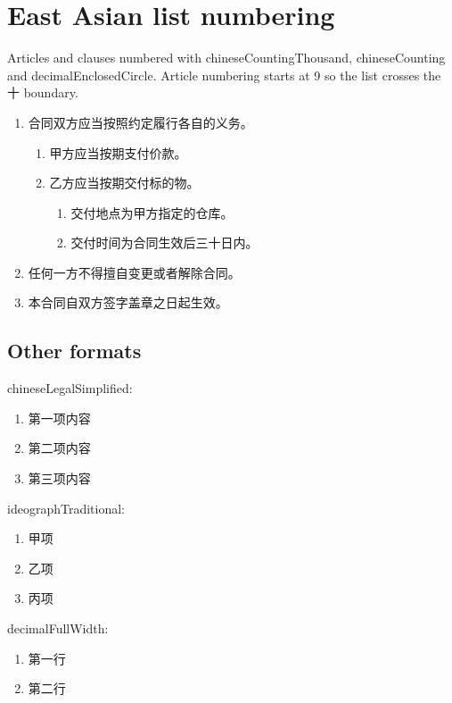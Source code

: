 \documentclass[11pt,a4paper]{article}
\begin{document}
\section{East Asian list numbering}

Articles and clauses numbered with chineseCountingThousand, chineseCounting and decimalEnclosedCircle. Article numbering starts at 9 so the list crosses the 十 boundary.

\begin{enumerate}
\item 合同双方应当按照约定履行各自的义务。
  \begin{enumerate}
\item 甲方应当按期支付价款。
\item 乙方应当按期交付标的物。
    \begin{enumerate}
\item 交付地点为甲方指定的仓库。
\item 交付时间为合同生效后三十日内。
    \end{enumerate}
  \end{enumerate}
\item 任何一方不得擅自变更或者解除合同。
\item 本合同自双方签字盖章之日起生效。
\end{enumerate}

\subsection{Other formats}

chineseLegalSimplified:

\begin{enumerate}
\item 第一项内容
\item 第二项内容
\item 第三项内容
\end{enumerate}

ideographTraditional:

\begin{enumerate}
\item 甲项
\item 乙项
\item 丙项
\end{enumerate}

decimalFullWidth:

\begin{enumerate}
\item 第一行
\item 第二行
\end{enumerate}
\end{document}
